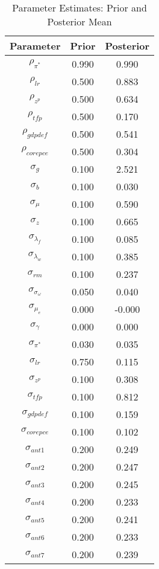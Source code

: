 \documentclass[12pt]{article}
\begin{document}
\pagestyle{empty}
\begin{table}[h]
\centering
\caption{Parameter Estimates: Prior and Posterior Mean}
\vspace*{.5cm}
\begin{tabular}{ccc}\hline 
 Parameter & Prior & Posterior  \tabularnewline \hline
$\rho_{\pi^*}$ &    0.990 &    0.990 \\
$\rho_{lr}$ &    0.500 &    0.883 \\
$\rho_{z^p}$ &    0.500 &    0.634 \\
$\rho_{tfp}$ &    0.500 &    0.170 \\
$\rho_{gdpdef}$ &    0.500 &    0.541 \\
$\rho_{corepce}$ &    0.500 &    0.304 \\
$\sigma_{g}$ &    0.100 &    2.521 \\
$\sigma_{b}$ &    0.100 &    0.030 \\
$\sigma_{\mu}$ &    0.100 &    0.590 \\
$\sigma_{z}$ &    0.100 &    0.665 \\
$\sigma_{\lambda_f}$ &    0.100 &    0.085 \\
$\sigma_{\lambda_w}$ &    0.100 &    0.385 \\
$\sigma_{rm}$ &    0.100 &    0.237 \\
$\sigma_{\sigma_\omega}$ &    0.050 &    0.040 \\
$\sigma_{\mu_e}$ &    0.000 &   -0.000 \\
$\sigma_{\gamma}$ &    0.000 &    0.000 \\
$\sigma_{\pi^*}$ &    0.030 &    0.035 \\
$\sigma_{lr}$ &    0.750 &    0.115 \\
$\sigma_{z^p}$ &    0.100 &    0.308 \\
$\sigma_{tfp}$ &    0.100 &    0.812 \\
$\sigma_{gdpdef}$ &    0.100 &    0.159 \\
$\sigma_{corepce}$ &    0.100 &    0.102 \\
$\sigma_{ant1}$ &    0.200 &    0.249 \\
$\sigma_{ant2}$ &    0.200 &    0.247 \\
$\sigma_{ant3}$ &    0.200 &    0.245 \\
$\sigma_{ant4}$ &    0.200 &    0.233 \\
$\sigma_{ant5}$ &    0.200 &    0.241 \\
$\sigma_{ant6}$ &    0.200 &    0.233 \\
$\sigma_{ant7}$ &    0.200 &    0.239 \\

\end{tabular}
\end{table}
\end{document}

